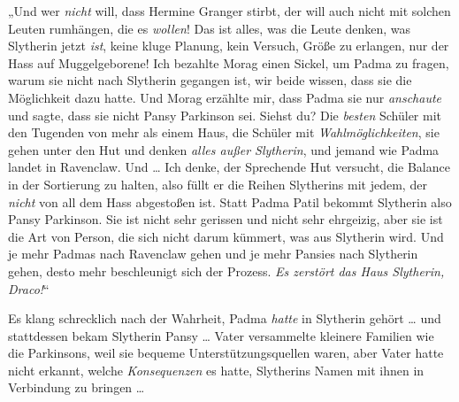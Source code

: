„Und wer \emph{nicht} will, dass Hermine Granger stirbt, der will auch nicht mit solchen Leuten rumhängen, die es \emph{wollen}! Das ist alles, was die Leute denken, was Slytherin jetzt \emph{ist}, keine kluge Planung, kein Versuch, Größe zu erlangen, nur der Hass auf Muggelgeborene! Ich bezahlte Morag einen Sickel, um Padma zu fragen, warum sie nicht nach Slytherin gegangen ist, wir beide wissen, dass sie die Möglichkeit dazu hatte. Und Morag erzählte mir, dass Padma sie nur \emph{anschaute} und sagte, dass sie nicht Pansy Parkinson sei. Siehst du? Die \emph{besten} Schüler mit den Tugenden von mehr als einem Haus, die Schüler mit \emph{Wahlmöglichkeiten}, sie gehen unter den Hut und denken \emph{alles außer Slytherin}, und jemand wie Padma landet in Ravenclaw. Und … Ich denke, der Sprechende Hut versucht, die Balance in der Sortierung zu halten, also füllt er die Reihen Slytherins mit jedem, der \emph{nicht} von all dem Hass abgestoßen ist. Statt Padma Patil bekommt Slytherin also Pansy Parkinson. Sie ist nicht sehr gerissen und nicht sehr ehrgeizig, aber sie ist die Art von Person, die sich nicht darum kümmert, was aus Slytherin wird. Und je mehr Padmas nach Ravenclaw gehen und je mehr Pansies nach Slytherin gehen, desto mehr beschleunigt sich der Prozess. \emph{Es zerstört das Haus Slytherin, Draco!}“

Es klang schrecklich nach der Wahrheit, Padma \emph{hatte} in Slytherin gehört … und stattdessen bekam Slytherin Pansy … Vater versammelte kleinere Familien wie die Parkinsons, weil sie bequeme Unterstützungsquellen waren, aber Vater hatte nicht erkannt, welche \emph{Konsequenzen} es hatte, Slytherins Namen mit ihnen in Verbindung zu bringen …

